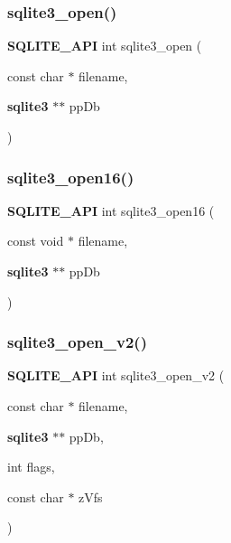 \mbox{\label{sqlite3_8h_a97ba966ed1acc38409786258268f5f71}} 
\subsubsection{sqlite3\_open()}
{\footnotesize\ttfamily \textbf{ S\+Q\+L\+I\+T\+E\+\_\+\+A\+PI} int sqlite3\+\_\+open (\begin{DoxyParamCaption}\item[{const char $\ast$}]{filename,  }\item[{\textbf{ sqlite3} $\ast$$\ast$}]{pp\+Db }\end{DoxyParamCaption})}

\mbox{\label{sqlite3_8h_adbc401bb96713f32e553db32f6f3ca33}} 
\subsubsection{sqlite3\_open16()}
{\footnotesize\ttfamily \textbf{ S\+Q\+L\+I\+T\+E\+\_\+\+A\+PI} int sqlite3\+\_\+open16 (\begin{DoxyParamCaption}\item[{const void $\ast$}]{filename,  }\item[{\textbf{ sqlite3} $\ast$$\ast$}]{pp\+Db }\end{DoxyParamCaption})}

\mbox{\label{sqlite3_8h_a140fe275b6975dc867cea50a65a217c4}} 
\subsubsection{sqlite3\_open\_v2()}
{\footnotesize\ttfamily \textbf{ S\+Q\+L\+I\+T\+E\+\_\+\+A\+PI} int sqlite3\+\_\+open\+\_\+v2 (\begin{DoxyParamCaption}\item[{const char $\ast$}]{filename,  }\item[{\textbf{ sqlite3} $\ast$$\ast$}]{pp\+Db,  }\item[{int}]{flags,  }\item[{const char $\ast$}]{z\+Vfs }\end{DoxyParamCaption})}

\mbox{\label{sqlite3_8h_a2288c95881ecca13d994e42b6a958906}} 
